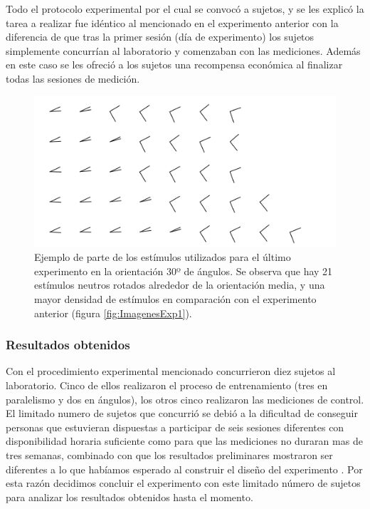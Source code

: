\documentclass{article}
\begin{document}
    Todo el protocolo experimental por el cual se convocó a sujetos, y se les explicó la tarea a realizar fue idéntico al mencionado en el experimento anterior con la diferencia de que tras la primer sesión (día de experimento) los sujetos simplemente concurrían al laboratorio y comenzaban con las mediciones. Además en este caso se les ofreció a los sujetos una recompensa económica al finalizar todas las sesiones de medición.
    
    \begin{figure}
        \center
        \includegraphics[width=\textwidth]{Imagenes/ImagenesExp2.png}
        \caption{Ejemplo de parte de los estímulos utilizados para el último experimento en la orientación 30º de ángulos. Se observa que hay 21 estímulos neutros rotados alrededor de la orientación media, y una mayor densidad de estímulos en comparación con el experimento anterior (figura \ref{fig:ImagenesExp1}).}
        \label{fig:ImagenesExp2}
    \end{figure}  
    
    \subsubsection{Resultados obtenidos}
    
    Con el procedimiento experimental mencionado concurrieron diez sujetos al laboratorio. Cinco de ellos realizaron el proceso de entrenamiento (tres en paralelismo y dos en ángulos), los otros cinco realizaron las mediciones de control. El limitado numero de sujetos que concurrió se debió a la dificultad de conseguir personas que estuvieran dispuestas a participar de seis sesiones diferentes con disponibilidad horaria suficiente como para que las mediciones no duraran mas de tres semanas, combinado con que los resultados preliminares mostraron ser diferentes a lo que habíamos esperado al construir el diseño del experimento . Por esta razón decidimos concluir el experimento con este limitado número de sujetos para analizar los resultados obtenidos hasta el momento.
    
\end{document}
